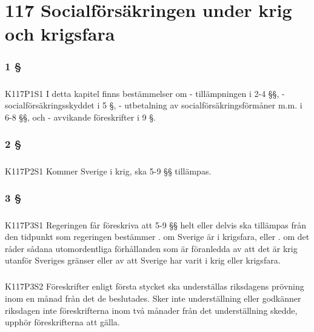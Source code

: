 \documentclass[a4paper,notitlepage,openany,10pt]{book}
\begin{document}
\chapter*{117 Socialförsäkringen under krig och krigsfara}
\subsection*{1 §}
\paragraph*{}
{\tiny K117P1S1}
I detta kapitel finns bestämmelser om
\newline - tillämpningen i 2-4 §§,
\newline - socialförsäkringsskyddet i 5 §,
\newline - utbetalning av socialförsäkringsförmåner m.m. i 6-8 §§, och
\newline - avvikande föreskrifter i 9 §.
\subsection*{2 §}
\paragraph*{}
{\tiny K117P2S1}
Kommer Sverige i krig, ska 5-9 §§ tillämpas.
\subsection*{3 §}
\paragraph*{}
{\tiny K117P3S1}
Regeringen får föreskriva att 5-9 §§ helt eller delvis ska tillämpas från den tidpunkt som regeringen bestämmer
. om Sverige är i krigsfara, eller
. om det råder sådana utomordentliga förhållanden som är föranledda av att det är krig utanför Sveriges gränser eller av att Sverige har varit i krig eller krigsfara.
\paragraph*{}
{\tiny K117P3S2}
Föreskrifter enligt första stycket ska underställas riksdagens prövning inom en månad från det de beslutades.
Sker inte underställning eller godkänner riksdagen inte föreskrifterna inom två månader från det underställning skedde, upphör föreskrifterna att gälla.
\end{document}
